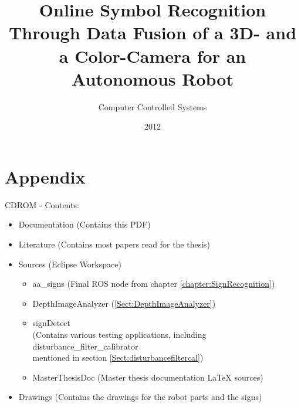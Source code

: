 \documentclass[oneside]{Ausarbeitung}
\title{Online Symbol Recognition Through Data Fusion of a 3D- and a
Color-Camera for an Autonomous Robot}
\subtitle{Computer Controlled Systems}
\date{2012}
\begin{document}
 
\maketitle 
 
 
 
\tableofcontents

\listoffigures

\listoftables

\lstlistoflistings











\chapter{Appendix}
CDROM - Contents:
\begin{itemize}
  \item Documentation (Contains this PDF)
  \item Literature (Contains most papers read for the thesis)
  \item Sources (Eclipse Workspace)
	\begin{itemize}
		\item aa\_signs (Final ROS node from chapter \vref{chapter:SignRecognition})
		\item DepthImageAnalyzer (\vref{Sect:DepthImageAnalyzer})
		\item signDetect \\
		(Contains various testing applications, including disturbance\_filter\_calibrator\\
		mentioned in section \vref{Sect:disturbancefiltercal})
		\item MasterThesisDoc (Master thesis documentation LaTeX sources)
	\end{itemize}
  \item Drawings (Contains the drawings for the robot parts and the signs)	
\end{itemize}

\nocite{*}


\end{document}
